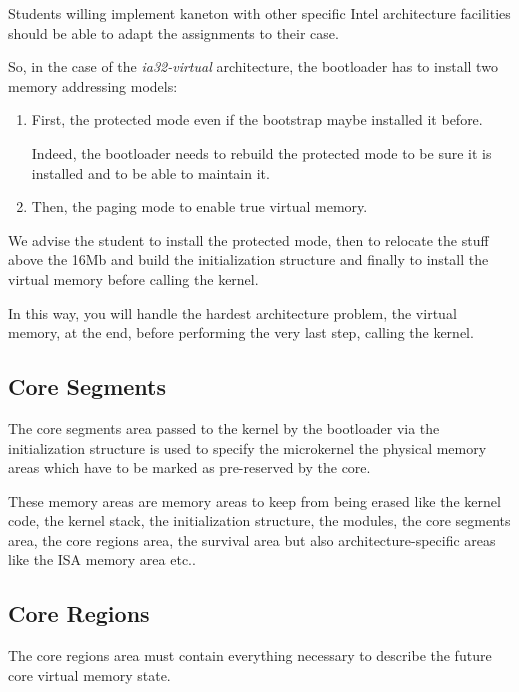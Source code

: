 Students willing implement kaneton with other specific Intel architecture
facilities should be able to adapt the assignments to their case.

So, in the case of the \textit{ia32-virtual} architecture, the bootloader
has to install two memory addressing models:

\begin{enumerate}
  \item
    First, the protected mode even if the bootstrap maybe installed it
    before.

    Indeed, the bootloader needs to rebuild the protected mode to be sure
    it is installed and to be able to maintain it.
  \item
    Then, the paging mode to enable true virtual memory.
\end{enumerate}

We advise the student to install the protected mode, then to relocate the
stuff above the 16Mb and build the initialization structure and finally to install the
virtual memory before calling the kernel.

In this way, you will handle the hardest architecture problem, the virtual
memory, at the end, before performing the very last step, calling the kernel.

%
%

\subsection{Core Segments}

The core segments area passed to the kernel by the bootloader via
the initialization structure is used to specify the microkernel the
physical memory areas which have to be marked as pre-reserved by the core.

These memory areas are memory areas to keep from being erased like the
kernel code, the kernel stack, the initialization structure, the modules,
the core segments area, the core regions area, the survival area but also
architecture-specific areas like the ISA memory area etc..

%
%

\subsection{Core Regions}

The core regions area must contain everything necessary to describe
the future core virtual memory state.

